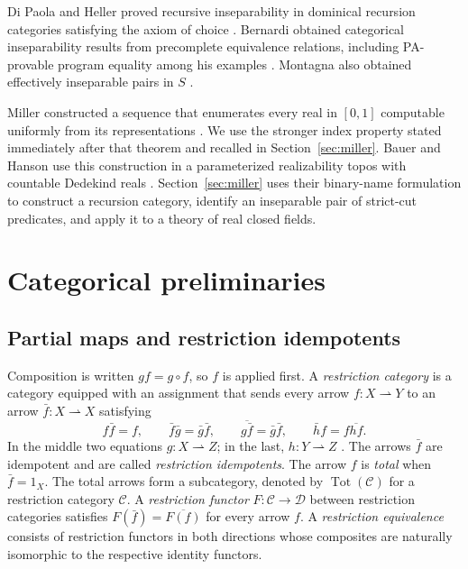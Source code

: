 \documentclass[11pt]{article}
\begin{document}
Di Paola and Heller proved recursive inseparability in dominical
recursion categories satisfying the axiom of choice
\cite[Theorem 8.15]{DPH}. Bernardi obtained categorical inseparability
results from precomplete equivalence relations, including PA-provable
program equality among his examples \cite[pp.~125--128]{Bernardi}.
Montagna also obtained effectively inseparable pairs in $S$
\cite[Remark 3.1]{Montagna}.


Miller constructed a sequence that enumerates every real in $[0,1]$
computable uniformly from its representations \cite[Theorem~6.3]{Miller2004}.
We use the stronger index property stated immediately after that
theorem and recalled in Section~\ref{sec:miller}.
Bauer and Hanson use this construction in a parameterized realizability
topos with countable Dedekind reals \cite{BauerHanson}.
Section~\ref{sec:miller} uses their binary-name formulation to construct
a recursion category, identify an inseparable pair of strict-cut
predicates, and apply it to a theory of real closed fields.

\section{Categorical preliminaries}\label{sec:preliminaries}

\subsection{Partial maps and restriction idempotents}

Composition is written $gf=g\circ f$, so $f$ is applied first.
A \emph{restriction category} is a category equipped with an assignment
that sends every arrow
$f:X\rightharpoonup Y$ to an arrow
$\bar f:X\rightharpoonup X$ satisfying
\[
 f\bar f=f,\qquad
 \bar f\bar g=\bar g\bar f,\qquad
 \overline{g\bar f}=\bar g\bar f,\qquad
 \bar h f=f\overline{hf}.
\]
In the middle two equations $g:X\rightharpoonup Z$; in the last,
$h:Y\rightharpoonup Z$ \cite{CockettLack}.
The arrows $\bar f$ are idempotent and are called
\emph{restriction idempotents}.
The arrow $f$ is \emph{total} when $\bar f=1_X$.
The total arrows form a subcategory, denoted by
$\operatorname{Tot}(\mathcal C)$ for a restriction category $\mathcal C$.
A \emph{restriction functor} $F:\mathcal C\to\mathcal D$ between
restriction categories satisfies $F(\bar f)=\overline{F(f)}$ for every
arrow $f$. A \emph{restriction equivalence} consists of restriction
functors in both directions whose composites are naturally isomorphic
to the respective identity functors.
\end{document}
